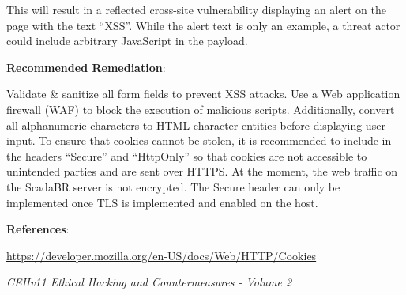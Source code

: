     This will result in a reflected cross-site vulnerability displaying an alert on the page with the text ``XSS''.  While the alert text is only an example, a threat actor could include arbitrary JavaScript in the payload.
    
    \noindent
    \textbf{Recommended Remediation}:
    
    Validate \& sanitize all form fields to prevent XSS attacks. Use a Web application firewall (WAF) to block the execution of malicious scripts. Additionally, convert all alphanumeric characters to HTML character entities before displaying user input. To ensure that cookies cannot be stolen, it is recommended to include in the headers ``Secure'' and ``HttpOnly'' so that cookies are not accessible to unintended parties and are sent over HTTPS. At the moment, the web traffic on the ScadaBR server is not encrypted. The Secure header can only be implemented once TLS is implemented and enabled on the host. 
    
    
    \noindent
    \textbf{References}:
    
    \url{https://developer.mozilla.org/en-US/docs/Web/HTTP/Cookies}
    
    \emph{CEHv11 Ethical Hacking and Countermeasures - Volume 2}
    